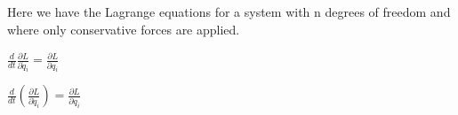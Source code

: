 \documentclass{article}
\begin{document}
Here we have the Lagrange equations for a system with n degrees of freedom and where only conservative forces are applied. \
\

$ \frac{d}{dt} \frac{\partial L}{\partial \dot q_{i}} = \frac{\partial L}{\partial q_{i}}{} $ \

$ \frac{d}{dt} \left( \frac{\partial L}{\partial \dot{q}_i} \right) = \frac{\partial L}{\partial q_i} $
\end{document}
